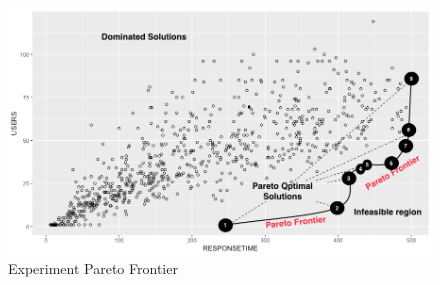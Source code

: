 \begin{figure}[h]
\centering
\includegraphics[width=1\textwidth]{./images/pareto0curve.png}
    \caption{Experiment Pareto Frontier}
\label{fig:paretofrontier1}
\end{figure}


